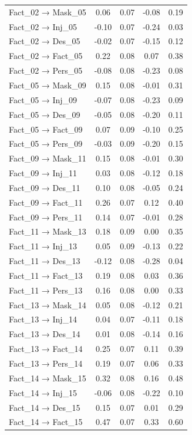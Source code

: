 \documentclass[
  man, donotrepeattitle,floatsintext]{apa6}
\begin{document}
\begin{center}
\begin{ThreePartTable}
{\begin{longtable}{lcccc}
Fact\_02 → Mask\_05 & 0.06 & 0.07 & -0.08 & 0.19\\
Fact\_02 → Inj\_05 & -0.10 & 0.07 & -0.24 & 0.03\\
Fact\_02 → Des\_05 & -0.02 & 0.07 & -0.15 & 0.12\\
Fact\_02 → Fact\_05 & 0.22 & 0.08 & 0.07 & 0.38\\
Fact\_02 → Pers\_05 & -0.08 & 0.08 & -0.23 & 0.08\\
Fact\_05 → Mask\_09 & 0.15 & 0.08 & -0.01 & 0.31\\
Fact\_05 → Inj\_09 & -0.07 & 0.08 & -0.23 & 0.09\\
Fact\_05 → Des\_09 & -0.05 & 0.08 & -0.20 & 0.11\\
Fact\_05 → Fact\_09 & 0.07 & 0.09 & -0.10 & 0.25\\
Fact\_05 → Pers\_09 & -0.03 & 0.09 & -0.20 & 0.15\\
Fact\_09 → Mask\_11 & 0.15 & 0.08 & -0.01 & 0.30\\
Fact\_09 → Inj\_11 & 0.03 & 0.08 & -0.12 & 0.18\\
Fact\_09 → Des\_11 & 0.10 & 0.08 & -0.05 & 0.24\\
Fact\_09 → Fact\_11 & 0.26 & 0.07 & 0.12 & 0.40\\
Fact\_09 → Pers\_11 & 0.14 & 0.07 & -0.01 & 0.28\\
Fact\_11 → Mask\_13 & 0.18 & 0.09 & 0.00 & 0.35\\
Fact\_11 → Inj\_13 & 0.05 & 0.09 & -0.13 & 0.22\\
Fact\_11 → Des\_13 & -0.12 & 0.08 & -0.28 & 0.04\\
Fact\_11 → Fact\_13 & 0.19 & 0.08 & 0.03 & 0.36\\
Fact\_11 → Pers\_13 & 0.16 & 0.08 & 0.00 & 0.33\\
Fact\_13 → Mask\_14 & 0.05 & 0.08 & -0.12 & 0.21\\
Fact\_13 → Inj\_14 & 0.04 & 0.07 & -0.11 & 0.18\\
Fact\_13 → Des\_14 & 0.01 & 0.08 & -0.14 & 0.16\\
Fact\_13 → Fact\_14 & 0.25 & 0.07 & 0.11 & 0.39\\
Fact\_13 → Pers\_14 & 0.19 & 0.07 & 0.06 & 0.33\\
Fact\_14 → Mask\_15 & 0.32 & 0.08 & 0.16 & 0.48\\
Fact\_14 → Inj\_15 & -0.06 & 0.08 & -0.22 & 0.10\\
Fact\_14 → Des\_15 & 0.15 & 0.07 & 0.01 & 0.29\\
Fact\_14 → Fact\_15 & 0.47 & 0.07 & 0.33 & 0.60\\

\end{longtable}}
\end{ThreePartTable}
\end{center}
\end{document}
